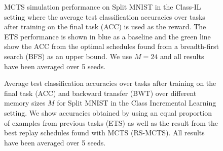 \begin{figure}[h]
  \centering
  \setlength{\figwidth}{0.5\columnwidth}
  \setlength{\figheight}{0.3\textwidth}
  
  \vspace{-6pt}
  \caption{MCTS simulation performance on Split MNIST in the Class-IL setting where the average test classification accuracies over tasks after training on the final task (ACC) is used as the reward. The ETS performance is shown in blue as a baseline and the green line show the ACC from the optimal schedules found from a breadth-first search (BFS) as an upper bound. We use $M= 24$ and all results have been averaged over 5 seeds.
  }%
  \label{fig:MNIST_mcts_best_rewards_M24_class_il_appendix}
\end{figure}

\begin{figure}[h]
  \centering
  \setlength{\figwidth}{0.5\columnwidth}
  \setlength{\figheight}{0.3\textwidth}
  
  \vspace{-4mm}
  \caption{Average test classification accuracies over tasks after training on the final task (ACC) and backward transfer (BWT) over different memory sizes $M$ for Split MNIST in the Class Incremental Learning setting. We show accuracies obtained by using an equal proportion of examples from previous tasks (ETS) as well as the result from the best replay schedules found with MCTS (RS-MCTS). All results have been averaged over 5 seeds.
  }%
  \label{fig:MNIST_ACC_BWT_over_M_class_il_appendix}
\end{figure}






